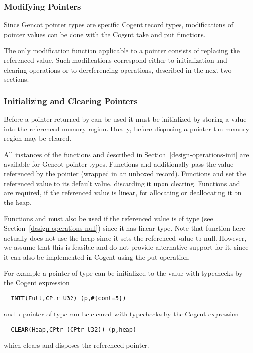 \subsubsection{Modifying Pointers}

Since Gencot pointer types are specific Cogent record types, modifications of pointer values can be done with the Cogent take and 
put functions.

The only modification function applicable to a pointer consists of replacing the referenced value. Such modifications correspond
either to initialization and clearing operations or to dereferencing operations, described in the next two sections.

\subsubsection{Initializing and Clearing Pointers}

Before a pointer returned by  can be used it must be initialized by storing a value into the referenced memory region.
Dually, before disposing a pointer the memory region may be cleared.

All instances of the functions  and  described in 
Section~\ref{design-operations-init} are available
for Gencot pointer types. Functions  and  additionally pass the value referenced
by the pointer (wrapped in an unboxed record). Functions  and  set the referenced
value to its default value, discarding it upon clearing. Functions  and  
are required, if the referenced value is linear, for allocating or deallocating it on the heap. 

Functions
 and  must also be used if the referenced value is of type  
(see Section~\ref{design-operations-null}) since it has linear type. Note that function  here
actually does not use the heap since it sets the referenced value to null. However, we assume that this is
feasible and do not provide alternative support for it, since it can also be implemented in Cogent using
the put operation.

For example a pointer  of type  can be initialized to the value  with typechecks by the 
Cogent expression
\begin{verbatim}
  INIT(Full,CPtr U32) (p,#{cont=5})
\end{verbatim}
and a pointer  of type  can be cleared with typechecks by the Cogent expression
\begin{verbatim}
  CLEAR(Heap,CPtr (CPtr U32)) (p,heap)
\end{verbatim}
which clears and disposes the referenced pointer.

